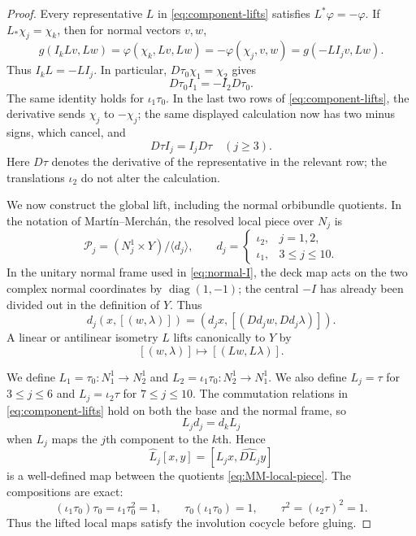 \documentclass[11pt]{article}
\theoremstyle{remark}\newtheorem{remark}[theorem]{Remark}
\newcommand{\diag}{\operatorname{diag}}
\begin{document}
\begin{proof}
Every representative $L$ in \eqref{eq:component-lifts} satisfies
$L^*\varphi=-\varphi$.  If $L_*\chi_j=\chi_k$, then for normal vectors
$v,w$,
\[
g(I_kLv,Lw)=\varphi(\chi_k,Lv,Lw)
           =-\varphi(\chi_j,v,w)=g(-LI_jv,Lw).
\]
Thus $I_kL=-LI_j$.  In particular, $D\tau_0\chi_1=\chi_2$ gives
\begin{equation}\label{eq:antilinear}D\tau_0I_1=-I_2D\tau_0.\end{equation}
The same identity holds for $\iota_1\tau_0$.  In the last two rows of
\eqref{eq:component-lifts}, the derivative sends $\chi_j$ to $-\chi_j$;
the same displayed calculation now has two minus signs, which cancel, and
\begin{equation}\label{eq:linear}D\tau I_j=I_jD\tau\quad(j\ge3).\end{equation}
Here $D\tau$ denotes the derivative of the representative in the relevant
row; the translations $\iota_2$ do not alter the calculation.

We now construct the global lift, including the normal orbibundle
quotients.  In the notation of Mart\'in--Merch\'an, the resolved local piece
over $N_j$ is
\begin{equation}\label{eq:MM-local-piece}
 \mathcal P_j=(N_j^1\times Y)/\langle d_j\rangle,
 \qquad
 d_j=\begin{cases}\iota_2,&j=1,2,\\
                   \iota_1,&3\leq j\leq10.
       \end{cases}
\end{equation}
In the unitary normal frame used in \eqref{eq:normal-I}, the deck map acts
on the two complex normal coordinates by $\diag(1,-1)$; the central
$-I$ has already been divided out in the definition of $Y$.  Thus
\[
 d_j(x,[(w,\lambda)])=
 (d_jx,[(D d_jw,Dd_j\lambda)]).
\]
A linear or antilinear isometry $L$ lifts canonically to $Y$ by
\begin{equation}\label{eq:canonical-Y-lift}
 [(w,\lambda)]\longmapsto[(Lw,L\lambda)].
\end{equation}

We define $L_1=\tau_0:N_1^1\to N_2^1$ and
$L_2=\iota_1\tau_0:N_2^1\to N_1^1$.  We also define
$L_j=\tau$ for $3\leq j\leq6$ and $L_j=\iota_2\tau$ for
$7\leq j\leq10$.  The commutation relations in
\eqref{eq:component-lifts} hold on both the base and the normal frame, so
\begin{equation}\label{eq:deck-equivariance}
 L_jd_j=d_kL_j
\end{equation}
when $L_j$ maps the $j$th component to the $k$th.  Hence
\[
 \widehat L_j[x,y]=[L_jx,\widehat{D L_j}y]
\]
is a well-defined map between the quotients \eqref{eq:MM-local-piece}.
The compositions are exact:
\[
 (\iota_1\tau_0)\tau_0=\iota_1\tau_0^2=1,
 \qquad \tau_0(\iota_1\tau_0)=1,
 \qquad \tau^2=(\iota_2\tau)^2=1.
\]
Thus the lifted local maps satisfy the involution cocycle before gluing.


\end{proof}
\end{document}
